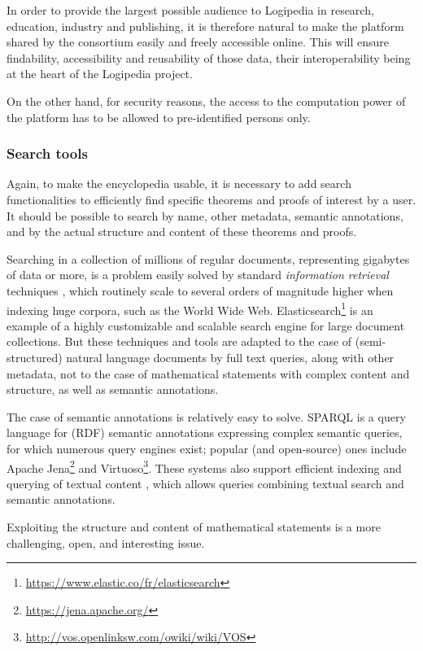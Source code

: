In order to provide the largest possible audience to Logipedia in
research, education, industry and publishing, it is therefore natural
to make the platform shared by the consortium easily and freely
accessible online. This will ensure findability,
accessibility and reusability of those data, their interoperability
being at the heart of the Logipedia project.

On the other hand, for security reasons, the access to the computation
power of the platform has to be allowed to pre-identified persons only.

\subsubsection*{Search tools}

Again, to make the encyclopedia usable, it is necessary to add search
functionalities to efficiently find specific theorems and proofs of
interest by a user. It should be possible to search by name, other
metadata, semantic annotations, and by the actual structure and content
of these theorems and proofs.

Searching in a collection of millions of regular documents, representing
gigabytes of data or more, is a problem easily solved by standard
\emph{information retrieval} techniques \cite{DBLP:books/daglib/0021593}, 
which routinely scale to several orders of magnitude higher when indexing
huge corpora, such as the World Wide Web.
Elasticsearch\footnote{\url{https://www.elastic.co/fr/elasticsearch}} is
an example of a highly customizable and scalable search engine for large
document collections. But these techniques and tools are
adapted to the case of (semi-structured) natural language documents by
full text queries, along with other metadata, not to the case of
mathematical statements with complex content and structure, as well as
semantic annotations.

The case of semantic annotations is relatively easy to solve. SPARQL
\cite{sparql} is a
query language for (RDF) semantic annotations expressing complex semantic
queries, for which numerous
query engines exist; popular (and open-source) ones include
Apache Jena\footnote{\url{https://jena.apache.org/}} and
Virtuoso\footnote{\url{http://vos.openlinksw.com/owiki/wiki/VOS}}. These
systems also support efficient indexing and querying of textual content
\cite{DBLP:conf/esws/MinackSN09}, which allows queries combining textual
search and semantic annotations.

Exploiting the structure and content of mathematical statements is a more
challenging, open, and interesting issue.

